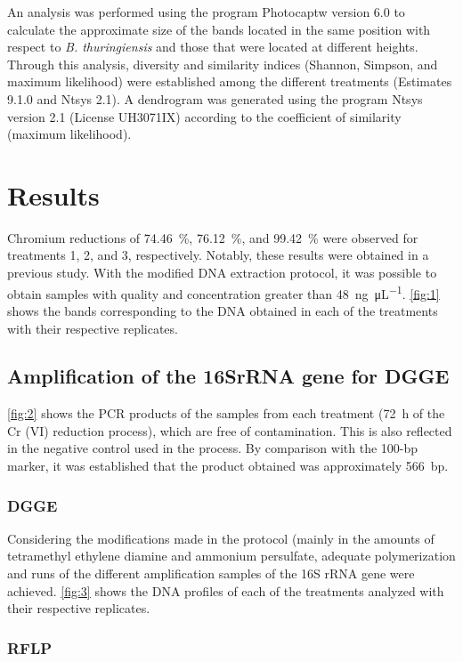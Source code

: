 \documentclass{univsciauth}
\begin{document}
An analysis was performed using the program Photocaptw version
6.0 to calculate the approximate size of the bands located in the same
position with respect to \emph{B. thuringiensis} and those that were
located at different heights. Through this analysis, diversity and
similarity indices (Shannon, Simpson, and maximum likelihood) were
established among the different treatments (Estimates 9.1.0 and Ntsys
2.1). A dendrogram was generated using the program Ntsys version 2.1
(License UH3071IX) according to the coefficient of similarity (maximum
likelihood).

\section{Results}

Chromium reductions of \SI{74.46}{\%}, \SI{76.12}{\%}, and \SI{99.42}{\%} were observed
for treatments 1, 2, and 3, respectively. Notably, these results were
obtained in a previous study. With the modified DNA extraction protocol,
it was possible to obtain samples with quality and concentration greater
than \SI{48}{ng.\micro L^{-1}}. \autoref{fig:1} shows the bands corresponding to the
DNA obtained in each of the treatments with their respective replicates.

\subsection{Amplification of the 16SrRNA gene for DGGE}

\autoref{fig:2} shows the PCR products of the samples from each
treatment (\SI{72}{h} of the Cr (VI) reduction process), which are free of
contamination. This is also reflected in the negative control used in
the process. By comparison with the 100-bp marker, it was established
that the product obtained was approximately \SI{566}{bp}.

\subsubsection{DGGE}

Considering the modifications made in the protocol (mainly in
the amounts of tetramethyl ethylene diamine and ammonium persulfate,
adequate polymerization and runs of the different amplification samples
of the 16S rRNA gene were achieved. \autoref{fig:3} shows the DNA profiles of
each of the treatments analyzed with their respective replicates.

\subsubsection{RFLP}
\end{document}
